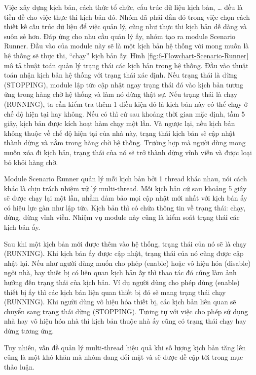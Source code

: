 \documentclass[12pt,a4paper,oneside]{extbook}
\begin{document}
Việc xây dựng kịch bản, cách thức tổ chức, cấu trúc dữ liệu kịch bản, … đều là tiền đề cho việc thực thi kịch bản đó. Nhóm đã phải đắn đó trong việc chọn cách thiết kế cấu trúc dữ liệu để việc quản lý, cũng như thực thi kịch bản dễ dàng và suôn sẻ hơn. Đáp ứng cho nhu cầu quản lý ấy, nhóm tạo ra module Scenario Runner. Đầu vào của module này sẽ là một kịch bản hệ thống với mong muốn là hệ thống sẽ thực thi, “chạy” kịch bản ấy. Hình \ref{fig:6-Flowchart-Scenario-Runner} mô tả thuật toán quản lý trạng thái các kịch bản trong hệ thống. Đầu vào thuật toán nhận kịch bản hệ thống với trạng thái xác định. Nếu trạng thái là dừng (STOPPING), module lập tức cập nhật ngay trạng thái đó vào kịch bản tương ứng trong hàng chờ hệ thống và làm nó dừng thật sự. Nếu trạng thái là chạy (RUNNING), ta cần kiểm tra thêm 1 điều kiện đó là kịch bản này có thể chạy ở chế độ hiện tại hay không. Nếu có thì cứ sau khoảng thời gian mặc định, tầm 5 giây, kịch bản được kích hoạt hàm chạy một lần. Và ngược lại, nếu kịch bản không thuộc về chế độ hiện tại của nhà này, trạng thái kịch bản sẽ cập nhật thành dừng và nằm trong hàng chờ hệ thống. Trường hợp mà người dùng mong muốn xóa đi kịch bản, trạng thái của nó sẽ trở thành dừng vĩnh viễn và được loại bỏ khỏi hàng chờ.

Module Scenario Runner quản lý mỗi kịch bản bởi 1 thread khác nhau, nói cách khác là chịu trách nhiệm xử lý multi-thread. Mỗi kịch bản cứ sau khoảng 5 giây sẽ được chạy lại một lần, nhằm đảm bảo mọi cập nhật mới nhất với kịch bản ấy có hiệu lực gàn như lập tức. Kịch bản thì có chứa thông tin về trạng thái: chạy, dừng, dừng vĩnh viễn. Nhiệm vụ module này cũng là kiểm soát trạng thái các kịch bản ấy.

Sau khi một kịch bản mới được thêm vào hệ thống, trạng thái của nó sẽ là chạy (RUNNING). Khi kịch bản ấy được cập nhật, trạng thái của nó cũng được cập nhật lại. Nếu như người dùng muốn cho phép (enable) hoặc vô hiệu hóa (disable) ngôi nhà, hay thiết bị có liên quan kịch bản ấy thì thao tác đó cũng làm ảnh hưởng đến trạng thái của kịch bản. Ví dụ người dùng cho phép dùng (enable) thiết bị ấy thì các kịch bản liện quan thiết bị đó sẽ mang trạng thái chạy (RUNNING). Khi người dùng vô hiệu hóa thiết bị, các kịch bản liên quan sẽ chuyển sang trạng thái dừng (STOPPING). Tương tự với việc cho phép sử dụng nhà hay vô hiệu hóa nhà thì kịch bản thuộc nhà ấy cũng có trạng thái chạy hay dừng tương ứng.

Tuy nhiên, vấn đề quản lý multi-thread hiệu quả khi số lượng kịch bản tăng lên cũng là một khó khăn mà nhóm đang đối mặt và sẽ được đề cập tới trong mục thảo luận.
\end{document}
